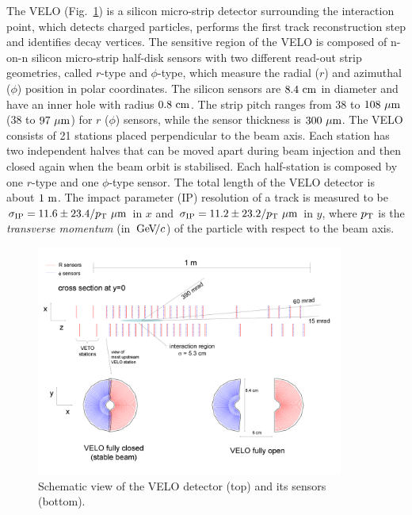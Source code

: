 The VELO \cite{LHCb-DP-2014-001} (Fig.~\ref{fig:VELO}) is a silicon micro-strip detector surrounding the interaction point, which detects charged particles, performs the first track reconstruction step and identifies decay vertices.
The sensitive region of the VELO is composed of n-on-n silicon micro-strip half-disk sensors with two different read-out strip geometries, called $r$-type and $\phi$-type, which measure the radial ($r$) and azimuthal ($\phi$)  position in polar coordinates. The silicon sensors are $8.4~\rm cm$ in diameter and have an inner hole with radius $0.8~\rm cm$. The strip pitch ranges from $38$ to $108~\rm\mu m$ ($38$ to $97~\rm\mu m$) for $r$ ($\phi$) sensors, while the sensor thickness is $300~\rm\mu m$.
The VELO consists of 21 stations placed perpendicular to the beam axis. Each station has two independent halves that can be moved apart during beam injection and then closed again when the beam orbit is stabilised. Each half-station is composed by one $r$-type and one $\phi$-type sensor. The total length of the VELO detector is about $1~\rm m$.
The impact parameter (IP) resolution of a track is measured to be $\sigma_{\rm IP}=11.6\pm23.4/\mbox{$p_{\rm T}$}~\rm\mu m$ in $x$ and  $\sigma_{\rm IP}=11.2\pm23.2/\mbox{$p_{\rm T}$}~\rm\mu m$ in $y$, where $\mbox{$p_{\rm T}$}$ is the \emph{transverse momentum} (in ${\mathrm{\,Ge\kern -0.1em V\!/}c}$) of the particle with respect to the beam axis. 

\begin{figure}[t]
  \begin{center}
    \includegraphics[width=0.9\textwidth]{02LHCb/figs/velo.png}
  \end{center}
  \vspace{-2mm}
  \caption{Schematic view of the VELO detector (top) and its sensors (bottom).}
  \label{fig:VELO}
\end{figure}

